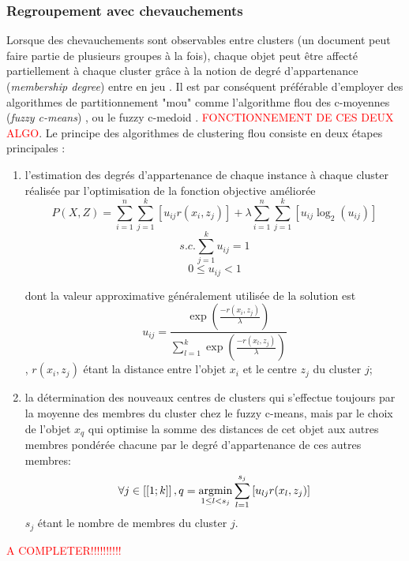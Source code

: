 \subsubsection{Regroupement avec chevauchements}
Lorsque des chevauchements sont observables entre clusters (un document peut faire partie de plusieurs groupes à la fois), chaque objet peut être affecté partiellement à chaque cluster grâce à la notion de degré d'appartenance (\textit{membership degree}) entre en jeu \citep{baraldi1999surveyfuzzyclstering}. Il est par conséquent préférable d'employer des algorithmes de partitionnement "mou" comme l'algorithme flou des c-moyennes (\textit{fuzzy c-means}) \citep{bezdek1984fcm, hathaway1989fuzzycmeans}, ou le fuzzy c-medoid \citep{krishnapuram2001fuzzycmedoids}. \textcolor{red}{FONCTIONNEMENT DE CES DEUX ALGO}. Le principe des algorithmes de clustering flou consiste en deux étapes principales \citep{sabzi2011fuzzykmedoids}: 
\begin{enumerate}
 \item l'estimation des degrés d'appartenance de chaque instance à chaque cluster réalisée par l'optimisation de la fonction objective améliorée
 \[P(X,Z) = \sum\limits_{i=1}^{n}\sum\limits_{j=1}^{k} \left[u_{ij}r(x_i,z_j)\right] + \lambda \sum\limits_{i=1}^{n}\sum\limits_{j=1}^{k} \left[ u_{ij}\log_2(u_{ij}) \right] \]
 \[s.c. \sum\limits_{j=1}^{k} u_{ij} = 1\]
 \[0 \leq u_{ij} < 1\]
 
 dont la valeur approximative généralement utilisée de la solution est \[u_{ij} = \frac{\exp\left(\frac{-r(x_i,z_j)}{\lambda}\right)}{\sum_{l=1}^{k}\exp\left(\frac{-r(x_l,z_j)}{\lambda}\right)}\], $r(x_i,z_j)$ étant la distance entre l'objet $x_i$ et le centre $z_j$ du cluster $j$;
 \item la détermination des nouveaux centres de clusters qui s'effectue toujours par la moyenne des membres du cluster chez le fuzzy c-means, mais par le choix de l'objet $x_q$ qui optimise la somme des distances de cet objet aux autres membres pondérée chacune par le degré d'appartenance de ces autres membres: \[\forall j \in \left[ \left[1;k \right] \right], q = \mathop{\mathrm{argmin}}\limits\limits_{1 \leq l < s_j} \sum\limits_{l=1}^{s_j} \left[u_{lj}r(x_l,z_j)\right]\] $s_j$ étant le nombre de membres du cluster $j$.
\end{enumerate}

\textcolor{red}{A COMPLETER!!!!!!!!!!}



